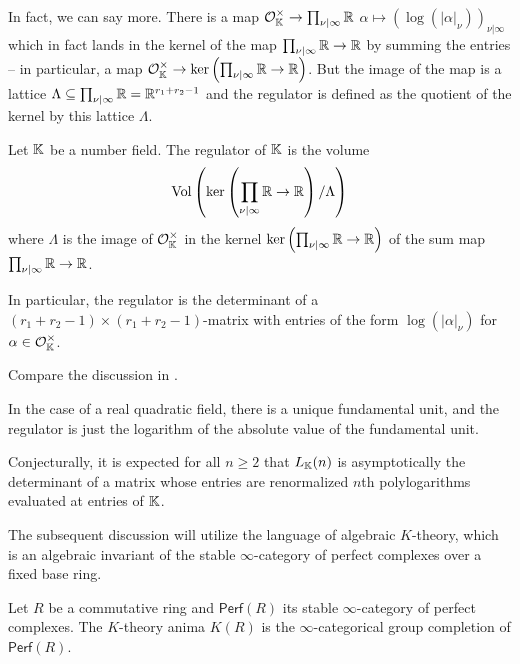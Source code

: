In fact, we can say more. There is a map $\mathcal{O}_{\mathbb{K}}^{\times}\to\prod_{\nu|\infty}\mathbb{R}$ $\alpha\mapsto(\log(|\alpha|_{\nu}))_{\nu|\infty}$ which in fact lands in the kernel of the map $\prod_{\nu|\infty}\mathbb{R}\to\mathbb{R}$ by summing the entries -- in particular, a map $\mathcal{O}_{\mathbb{K}}^{\times}\to\ker\left(\prod_{\nu|\infty}\mathbb{R}\to\mathbb{R}\right)$. But the image of the map is a lattice $\Lambda\subseteq\prod_{\nu|\infty}\mathbb{R}=\mathbb{R}^{r_{1}+r_{2}-1}$ and the regulator is defined as the quotient of the kernel by this lattice $\Lambda$. 
\begin{definition}[Regulator]\label{def: regulator}
    Let $\mathbb{K}$ be a number field. The regulator of $\mathbb{K}$ is the volume $$\mathrm{Vol}\left(\ker\left(\prod_{\nu|\infty}\mathbb{R}\to\mathbb{R}\right)/\Lambda\right)$$ where $\Lambda$ is the image of $\mathcal{O}_{\mathbb{K}}^{\times}$ in the kernel $\ker\left(\prod_{\nu|\infty}\mathbb{R}\to\mathbb{R}\right)$ of the sum map $\prod_{\nu|\infty}\mathbb{R}\to\mathbb{R}$. 
\end{definition}
\begin{remark}
    In particular, the regulator is the determinant of a $(r_{1}+r_{2}-1)\times(r_{1}+r_{2}-1)$-matrix with entries of the form $\log(|\alpha|_{\nu})$ for $\alpha\in\mathcal{O}_{\mathbb{K}}^{\times}$. 
\end{remark}
Compare the discussion in \cite[\S 5]{milneANT}. 
\begin{example}
    In the case of a real quadratic field, there is a unique fundamental unit, and the regulator is just the logarithm of the absolute value of the fundamental unit. 
\end{example}
\begin{remark}\label{rmk: Zagier conjecture}
    Conjecturally, it is expected for all $n\geq2$ that $L_{\mathbb{K}}(n)$ is asymptotically the determinant of a matrix whose entries are renormalized $n$th polylogarithms evaluated at entries of $\mathbb{K}$. 
\end{remark}
The subsequent discussion will utilize the language of algebraic $K$-theory, which is an algebraic invariant of the stable $\infty$-category of perfect complexes over a fixed base ring. 
\begin{definition}\label{def: K-theory of a ring}
    Let $R$ be a commutative ring and $\mathsf{Perf}(R)$ its stable $\infty$-category of perfect complexes. The $K$-theory anima $K(R)$ is the $\infty$-categorical group completion of $\mathsf{Perf}(R)$.
\end{definition}
